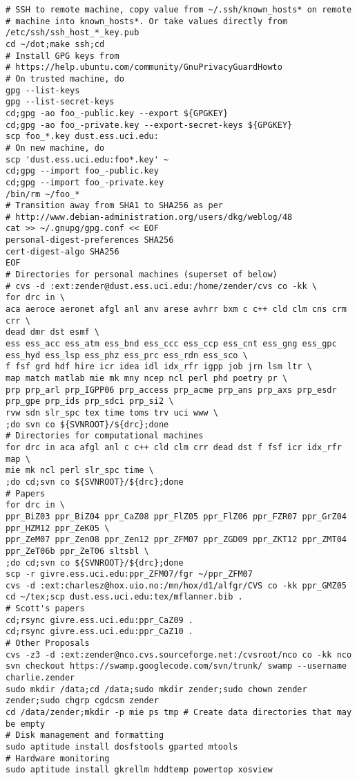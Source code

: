 \documentclass[12pt,twoside]{article}
\begin{document}
\begin{verbatim}
# SSH to remote machine, copy value from ~/.ssh/known_hosts* on remote
# machine into known_hosts*. Or take values directly from /etc/ssh/ssh_host_*_key.pub
cd ~/dot;make ssh;cd
# Install GPG keys from
# https://help.ubuntu.com/community/GnuPrivacyGuardHowto
# On trusted machine, do
gpg --list-keys
gpg --list-secret-keys
cd;gpg -ao foo_-public.key --export ${GPGKEY}
cd;gpg -ao foo_-private.key --export-secret-keys ${GPGKEY}
scp foo_*.key dust.ess.uci.edu:
# On new machine, do
scp 'dust.ess.uci.edu:foo*.key' ~
cd;gpg --import foo_-public.key
cd;gpg --import foo_-private.key
/bin/rm ~/foo_*
# Transition away from SHA1 to SHA256 as per
# http://www.debian-administration.org/users/dkg/weblog/48
cat >> ~/.gnupg/gpg.conf << EOF
personal-digest-preferences SHA256
cert-digest-algo SHA256
EOF
# Directories for personal machines (superset of below)
# cvs -d :ext:zender@dust.ess.uci.edu:/home/zender/cvs co -kk \
for drc in \
aca aeroce aeronet afgl anl anv arese avhrr bxm c c++ cld clm cns crm crr \
dead dmr dst esmf \
ess ess_acc ess_atm ess_bnd ess_ccc ess_ccp ess_cnt ess_gng ess_gpc ess_hyd ess_lsp ess_phz ess_prc ess_rdn ess_sco \
f fsf grd hdf hire icr idea idl idx_rfr igpp job jrn lsm ltr \
map match matlab mie mk mny ncep ncl perl phd poetry pr \
prp prp_arl prp_IGPP06 prp_access prp_acme prp_ans prp_axs prp_esdr prp_gpe prp_ids prp_sdci prp_si2 \
rvw sdn slr_spc tex time toms trv uci www \
;do svn co ${SVNROOT}/${drc};done
# Directories for computational machines
for drc in aca afgl anl c c++ cld clm crr dead dst f fsf icr idx_rfr map \
mie mk ncl perl slr_spc time \
;do cd;svn co ${SVNROOT}/${drc};done
# Papers
for drc in \
ppr_BiZ03 ppr_BiZ04 ppr_CaZ08 ppr_FlZ05 ppr_FlZ06 ppr_FZR07 ppr_GrZ04 ppr_HZM12 ppr_ZeK05 \
ppr_ZeM07 ppr_Zen08 ppr_Zen12 ppr_ZFM07 ppr_ZGD09 ppr_ZKT12 ppr_ZMT04 ppr_ZeT06b ppr_ZeT06 sltsbl \
;do cd;svn co ${SVNROOT}/${drc};done
scp -r givre.ess.uci.edu:ppr_ZFM07/fgr ~/ppr_ZFM07
cvs -d :ext:charlesz@hox.uio.no:/mn/hox/d1/alfgr/CVS co -kk ppr_GMZ05 
cd ~/tex;scp dust.ess.uci.edu:tex/mflanner.bib .
# Scott's papers
cd;rsync givre.ess.uci.edu:ppr_CaZ09 .
cd;rsync givre.ess.uci.edu:ppr_CaZ10 .
# Other Proposals
cvs -z3 -d :ext:zender@nco.cvs.sourceforge.net:/cvsroot/nco co -kk nco
svn checkout https://swamp.googlecode.com/svn/trunk/ swamp --username charlie.zender
sudo mkdir /data;cd /data;sudo mkdir zender;sudo chown zender zender;sudo chgrp cgdcsm zender
cd /data/zender;mkdir -p mie ps tmp # Create data directories that may be empty
# Disk management and formatting
sudo aptitude install dosfstools gparted mtools 
# Hardware monitoring 
sudo aptitude install gkrellm hddtemp powertop xosview

\end{verbatim}
\end{document}
